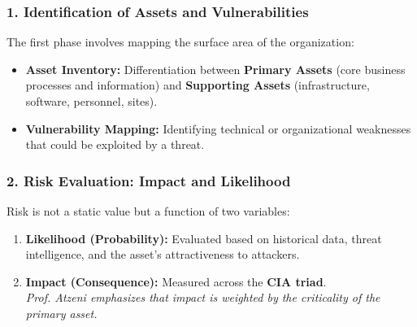 \subsubsection*{1. Identification of Assets and Vulnerabilities}
The first phase involves mapping the surface area of the organization:
\begin{itemize}
    \item \textbf{Asset Inventory:} Differentiation between \textbf{Primary Assets} (core business processes and information) and \textbf{Supporting Assets} (infrastructure, software, personnel, sites).
    \item \textbf{Vulnerability Mapping:} Identifying technical or organizational weaknesses that could be exploited by a threat.
\end{itemize}

\subsubsection*{2. Risk Evaluation: Impact and Likelihood}
Risk is not a static value but a function of two variables:
\begin{enumerate}
    \item \textbf{Likelihood (Probability):} Evaluated based on historical data, threat intelligence, and the asset's attractiveness to attackers.
    \item \textbf{Impact (Consequence):} Measured across the \textbf{CIA triad}. \\
    \textit{Prof. Atzeni emphasizes that impact is weighted by the criticality of the primary asset.}
\end{enumerate}

